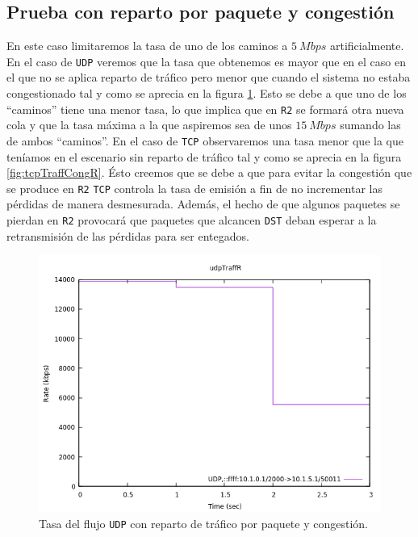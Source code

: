 \documentclass[11pt]{article}
\begin{document}
            \subsection{Prueba con reparto por paquete y congestión}
                En este caso limitaremos la tasa de uno de los caminos a $5\ Mbps$ artificialmente. En el caso de \texttt{UDP} veremos que la tasa que obtenemos es mayor que en el caso en el que no se aplica reparto de tráfico pero menor que cuando el sistema no estaba congestionado tal y como se aprecia en la figura \ref{fig:udpTraffCongR}. Esto se debe a que uno de los ``caminos'' tiene una menor tasa, lo que implica que en \texttt{R2} se formará otra nueva cola y que la tasa máxima a la que aspiremos sea de unos $15\ Mbps$ sumando las de ambos ``caminos''. En el caso de \texttt{TCP} observaremos una tasa menor que la que teníamos en el escenario sin reparto de tráfico tal y como se aprecia en la figura \ref{fig:tcpTraffCongR}. Ésto creemos que se debe a que para evitar la congestión que se produce en \texttt{R2} \texttt{TCP} controla la tasa de emisión a fin de no incrementar las pérdidas de manera desmesurada. Además, el hecho de que algunos paquetes se pierdan en \texttt{R2} provocará que paquetes que alcancen \texttt{DST} deban esperar a la retransmisión de las pérdidas para ser entegados.

                \begin{figure}
                    \centering
                    \includegraphics[width=0.6\linewidth]{udpTraffCongR.png}
                    \caption{Tasa del flujo \texttt{UDP} con reparto de tráfico por paquete y congestión.}
                    \label{fig:udpTraffCongR}
                \end{figure}
\end{document}
